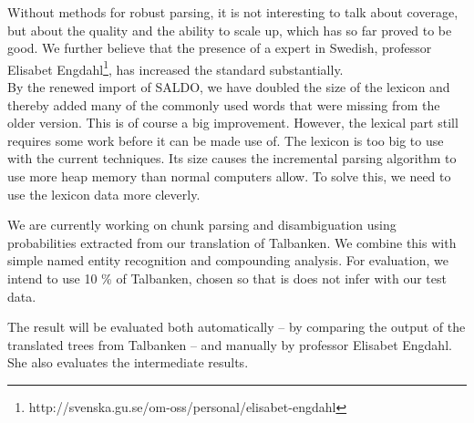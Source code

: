 \documentclass[10pt, a4paper]{article}
\begin{document}
Without methods for robust parsing, %
it is not interesting to talk about coverage, but about the quality and
the ability to scale up, which has so far proved to be good.
We further believe that the presence of a expert in Swedish, professor Elisabet
Engdahl\footnote{http://svenska.gu.se/om-oss/personal/elisabet-engdahl},
has increased the standard substantially.\\

By the renewed import of SALDO, we have doubled the size of the lexicon and thereby
added many of the commonly used words that were missing from the older
version. This is of course a big improvement.
However, the lexical part still requires some work before it can be made use of.
The lexicon is too big to use with the current techniques. Its size causes the
incremental parsing algorithm to use more heap memory than normal computers
allow. To solve this, we need to use the lexicon data more cleverly.

We are currently working on chunk parsing and disambiguation using probabilities
extracted from our translation of Talbanken. We combine this with simple named
entity recognition and compounding analysis. For evaluation, we intend to use
10 \% of Talbanken, chosen so that is does not infer with our test data.

%

The result will be evaluated both automatically -- by comparing the output of
the translated trees from Talbanken -- and manually by professor Elisabet Engdahl.
She also evaluates the intermediate results.
\end{document}
